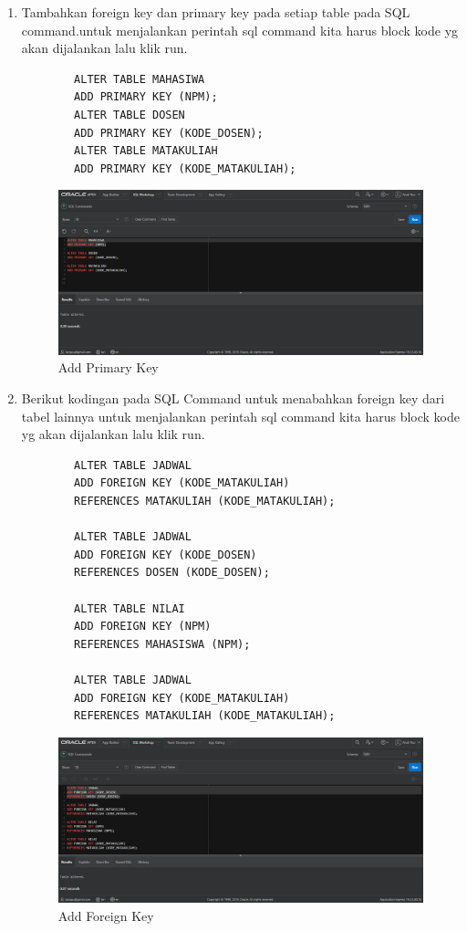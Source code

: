 \begin{enumerate}
    \item Tambahkan foreign key dan primary key pada setiap table pada SQL command.untuk menjalankan perintah sql command kita harus block kode yg akan dijalankan lalu klik run.
     \begin{verbatim}
        ALTER TABLE MAHASIWA
        ADD PRIMARY KEY (NPM);
        ALTER TABLE DOSEN
        ADD PRIMARY KEY (KODE_DOSEN);
        ALTER TABLE MATAKULIAH 
        ADD PRIMARY KEY (KODE_MATAKULIAH);
    \end{verbatim}
    \newpage
        \begin{figure}[!htbp]
        \centering
        \includegraphics[width=13cm]{figures/6.PNG}
        \caption{Add Primary Key}
    \end{figure}    
    
     \item Berikut kodingan pada SQL Command untuk menabahkan foreign key dari tabel lainnya untuk menjalankan perintah sql command kita harus block kode yg akan dijalankan lalu klik run.
        \begin{verbatim}
        ALTER TABLE JADWAL
        ADD FOREIGN KEY (KODE_MATAKULIAH)
        REFERENCES MATAKULIAH (KODE_MATAKULIAH);

        ALTER TABLE JADWAL
        ADD FOREIGN KEY (KODE_DOSEN)
        REFERENCES DOSEN (KODE_DOSEN);

        ALTER TABLE NILAI
        ADD FOREIGN KEY (NPM)
        REFERENCES MAHASISWA (NPM);

        ALTER TABLE JADWAL
        ADD FOREIGN KEY (KODE_MATAKULIAH)
        REFERENCES MATAKULIAH (KODE_MATAKULIAH);
    \end{verbatim}
    \newpage
        \begin{figure}[!htbp]
        \centering
        \includegraphics[width=13cm]{figures/7.PNG}
        \caption{Add Foreign Key}
    \end{figure}  


\end{enumerate}
